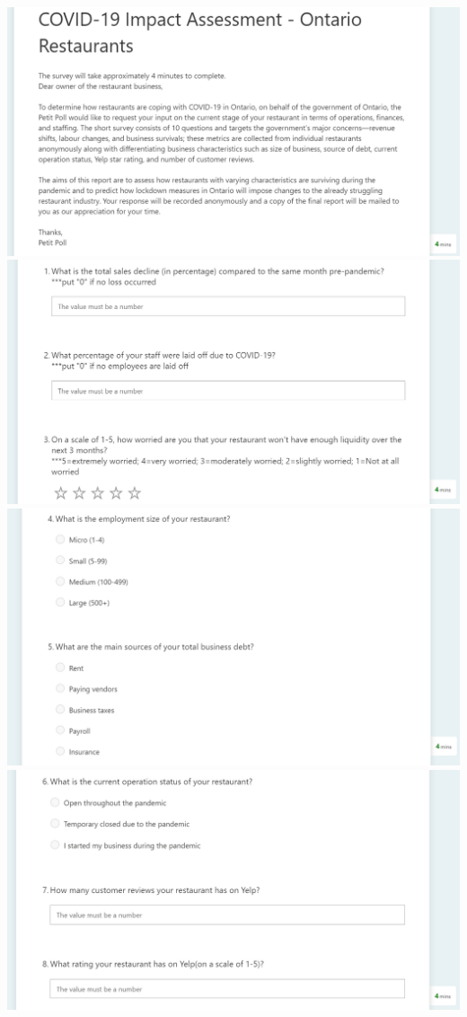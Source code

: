 \documentclass[
]{article}
\begin{document}
\includegraphics{"../../inputs/survey_opening.png"}
\includegraphics{"../../inputs/survey_topline.png"}
\includegraphics{"../../inputs/survey_q4_q5.png"}
\includegraphics{"../../inputs/survey_q6_q7_q8.png"}
\end{document}
